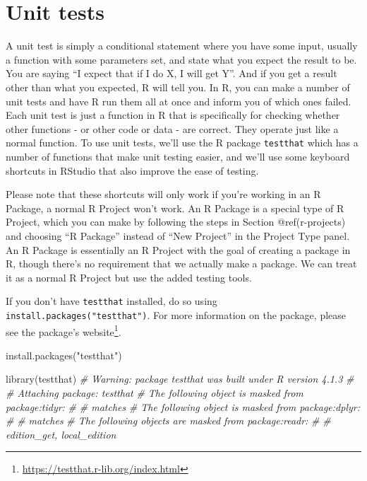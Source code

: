 \documentclass[
  a4paper,
]{krantz}
\makeatletter
\newenvironment{Shaded}{\begin{snugshade}}{\end{snugshade}}
\newcommand{\CommentTok}[1]{\textcolor[rgb]{0.56,0.35,0.01}{\textit{#1}}}
\newcommand{\FunctionTok}[1]{\textcolor[rgb]{0.00,0.00,0.00}{#1}}
\newcommand{\NormalTok}[1]{#1}
\newcommand{\StringTok}[1]{\textcolor[rgb]{0.31,0.60,0.02}{#1}}
\renewcommand{\href}[2]{#2\footnote{\url{#1}}}
\newenvironment{kframe}{%
\medskip{}
\setlength{\fboxsep}{.8em}
 \def\at@end@of@kframe{}%
 \ifinner\ifhmode%
  \def\at@end@of@kframe{\end{minipage}}%
  \begin{minipage}{\columnwidth}%
 \fi\fi%
 \def\FrameCommand##1{\hskip\@totalleftmargin \hskip-\fboxsep
 \colorbox{shadecolor}{##1}\hskip-\fboxsep
     \hskip-\linewidth \hskip-\@totalleftmargin \hskip\columnwidth}%
 \MakeFramed {\advance\hsize-\width
   \@totalleftmargin\z@ \linewidth\hsize
   \@setminipage}}%
 {\par\unskip\endMakeFramed%
 \at@end@of@kframe}
\renewenvironment{Shaded}{\begin{kframe}}{\end{kframe}}
\makeatother
\begin{document}
\hypertarget{unit-tests}{%
\section{Unit tests}\label{unit-tests}}

A unit test is simply a conditional statement where you have
some input, usually a function with some parameters set, and
state what you expect the result to be. You are saying ``I
expect that if I do X, I will get Y''. And if you get a
result other than what you expected, R will tell you. In R,
you can make a number of unit tests and have R run them all
at once and inform you of which ones failed. Each unit test
is just a function in R that is specifically for checking
whether other functions - or other code or data - are
correct. They operate just like a normal function. To use
unit tests, we'll use the R package \texttt{testthat} which
has a number of functions that make unit testing easier, and
we'll use some keyboard shortcuts in RStudio that also
improve the ease of testing.

Please note that these shortcuts will only work if you're
working in an R Package, a normal R Project won't work. An R
Package is a special type of R Project, which you can make
by following the steps in Section @ref(r-projects) and
choosing ``R Package'' instead of ``New Project'' in the
Project Type panel. An R Package is essentially an R Project
with the goal of creating a package in R, though there's no
requirement that we actually make a package. We can treat it
as a normal R Project but use the added testing tools.

If you don't have \texttt{testthat} installed, do so using
\texttt{install.packages("testthat")}. For more information
on the package, please see the package's
\href{https://testthat.r-lib.org/index.html}{website}.

\begin{Shaded}
\begin{Highlighting}[]
\FunctionTok{install.packages}\NormalTok{(}\StringTok{"testthat"}\NormalTok{)}
\end{Highlighting}
\end{Shaded}

\begin{Shaded}
\begin{Highlighting}[]
\FunctionTok{library}\NormalTok{(testthat)}
\CommentTok{\# Warning: package \textquotesingle{}testthat\textquotesingle{} was built under R version 4.1.3}
\CommentTok{\# }
\CommentTok{\# Attaching package: \textquotesingle{}testthat\textquotesingle{}}
\CommentTok{\# The following object is masked from \textquotesingle{}package:tidyr\textquotesingle{}:}
\CommentTok{\# }
\CommentTok{\#     matches}
\CommentTok{\# The following object is masked from \textquotesingle{}package:dplyr\textquotesingle{}:}
\CommentTok{\# }
\CommentTok{\#     matches}
\CommentTok{\# The following objects are masked from \textquotesingle{}package:readr\textquotesingle{}:}
\CommentTok{\# }
\CommentTok{\#     edition\_get, local\_edition}
\end{Highlighting}
\end{Shaded}
\end{document}
